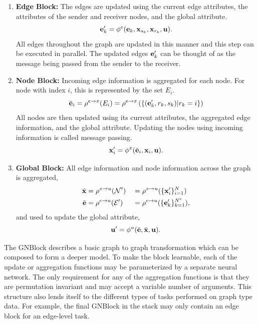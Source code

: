 \begin{enumerate}
    \item \textbf{Edge Block:} The edges are updated using the current edge attributes, the attributes of the sender and receiver nodes, and the global attribute.
          \begin{equation}
              \mathbf{e}_k' = \phi^e(\mathbf{e}_k, \mathbf{x}_{s_k}, \mathbf{x}_{r_k}, \mathbf{u}).
          \end{equation}
          All edges throughout the graph are updated in this manner and this step can be executed in parallel.
          The updated edges $\mathbf{e}_k'$ can be thought of as the message being passed from the sender to the receiver.
    \item \textbf{Node Block:} Incoming edge information is aggregated for each node.
          For node with index $i$, this is represented by the set $E_i$.
          \begin{equation}
              \bar{\mathbf{e}}_i = \rho^{e \to x}(E_i) = \rho^{e \to x}\left(\{(\mathbf{e}_k', r_k, s_k) | r_k = i\}\right)
          \end{equation}
          All nodes are then updated using its current attributes, the aggregated edge information, and the global attribute.
          Updating the nodes using incoming information is called message passing.
          \begin{equation}
              \mathbf{x}_i' = \phi^x(\bar{\mathbf{e}}_i, \mathbf{x}_i, \mathbf{u}).
          \end{equation}
    \item \textbf{Global Block:} All edge information and node information across the graph is aggregated,
          \begin{alignat}{2}
              \bar{\mathbf{x}}    & = \rho^{x \to u}(\mathcal{N}') &  & = \rho^{x \to u}(\{\mathbf{x}_i'\}_{i=1}^{N})       \\
              \bar{\mathbf{e}} & = \rho^{e \to u}(\mathcal{E}') &  & = \rho^{e \to u}(\{\mathbf{e}_k'\}_{k=1}^{N^e}),
          \end{alignat}
          and used to update the global attribute,
          \begin{equation}
              \mathbf{u}' = \phi^u( \bar{\mathbf{e}}, \bar{\mathbf{x}}, \mathbf{u}).
          \end{equation}
\end{enumerate}

The \Gls{GNBlock} describes a basic graph to graph transformation which can be composed to form a deeper model.
To make the block learnable, each of the update or aggregation functions may be parameterized by a separate neural network.
The only requirement for any of the aggregation functions is that they are permutation invariant and may accept a variable number of arguments.
This structure also lends itself to the different types of tasks performed on graph type data.
For example, the final \Gls{GNBlock} in the stack may only contain an edge block for an edge-level task.

